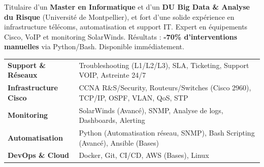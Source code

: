 \documentclass[11pt,a4paper]{article}
\begin{document}

Titulaire d'un \textbf{Master en Informatique} et d'un \textbf{DU Big Data \& Analyse du Risque} (Université de Montpellier), et fort d'une solide expérience en infrastructure télécoms, automatisation et support IT. Expert en équipements Cisco, VoIP et monitoring SolarWinds. Résultats : \textbf{-70\% d'interventions manuelles} via Python/Bash. Disponible immédiatement.

\noindent
\begin{tabularx}{\linewidth}{@{} p{3.5cm} X @{}}
\textbf{Support \& Réseaux} & Troubleshooting (L1/L2/L3), SLA, Ticketing, Support VOIP, Astreinte 24/7 \\
\textbf{Infrastructure Cisco} & CCNA R\&S/Security, Routeurs/Switches (Cisco 2960), TCP/IP, OSPF, VLAN, QoS, STP \\
\textbf{Monitoring} & SolarWinds (Avancé), SNMP, Analyse de logs, Dashboards, Alerting \\
\textbf{Automatisation} & Python (Automatisation réseau, SNMP), Bash Scripting (Avancé), Ansible (Bases) \\
\textbf{DevOps \& Cloud} & Docker, Git, CI/CD, AWS (Bases), Linux \\
\end{tabularx}
\end{document}
